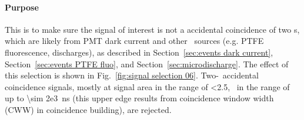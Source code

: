 \paragraph{Purpose}
This is to make sure the signal of interest is not a accidental coincidence of two \sphe s, which are likely from PMT dark current and other \sphe\ sources (e.g. PTFE fluorescence, discharges), as described in Section~\ref{sec:events dark current}, Section~\ref{sec:events PTFE fluo}, and Section~\ref{sec:microdischarge}. The effect of this selection is shown in Fig.~\ref{fig:signal selection 06}. Two-\sphe\ accidental coincidence signals, mostly at signal area in the range of \SI{<2.5}{\phe}, \rpd\ in the range of up to \SI{\sim 2e3}{\ns} (this upper edge results from coincidence window width (CWW) in coincidence building), are rejected.

